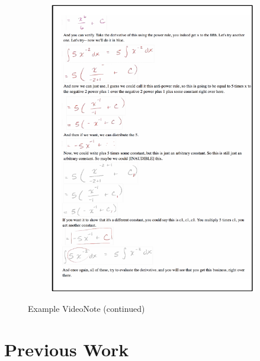 \begin{figure}[!ht]\ContinuedFloat
        \centering
        \begin{subfigure}[b]{\textwidth}
        \includegraphics[width=\textwidth]{figures/khan3_page2.pdf}
        \end{subfigure}       
        \caption{Example VideoNote (continued)}
        \label{Fig:videonote_example} 
\end{figure}
%

\section{Previous Work}
%
